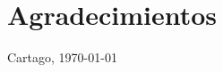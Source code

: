 \chapter*{Agradecimientos}
\thispagestyle{empty}


\vspace*{1cm}

\scriptAuthor

Cartago, \today

\cleardoublepage

